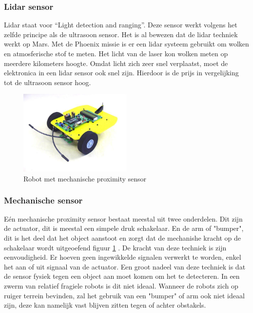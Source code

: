 \documentclass[10pt,a4paper]{article}
\begin{document}
\subsubsection{Lidar sensor}
Lidar staat voor “Light detection and ranging”. Deze sensor werkt volgens het zelfde principe als de ultrasoon sensor. Het is al bewezen dat de lidar techniek werkt op Mars. Met de Phoenix missie is er een lidar systeem gebruikt om wolken en atmosferische stof te meten\cite{lidarmars}. Het licht van de laser kon wolken meten op meerdere kilometers hoogte. Omdat licht zich zeer snel verplaatst, moet de elektronica in een lidar sensor ook snel zijn. Hierdoor is de prijs in vergelijking tot de ultrasoon sensor hoog.

\begin{figure}[!ht]

  \centering
      \includegraphics[width=0.5\textwidth]{voelsprieten.jpg}
  \caption{Robot met mechanische proximity sensor}  \label{voelspriet}
 
\end{figure}

\subsubsection{Mechanische sensor}
Eén mechanische proximity sensor bestaat meestal uit twee onderdelen. Dit zijn de actuator, dit is meestal een simpele druk schakelaar. En de arm of "bumper", dit is het deel dat het object aanstoot en zorgt dat de mechanishe kracht op de schakelaar wordt uitgeoefend figuur \ref{voelspriet} . De kracht van deze techniek is zijn eenvoudigheid. Er hoeven geen ingewikkelde signalen verwerkt te worden, enkel het aan of uit signaal van de actuator. Een groot nadeel van deze techniek is dat de sensor fysiek tegen een object aan moet komen om het te detecteren. In een zwerm van relatief fragiele robots is dit niet ideaal. Wanneer de robots zich op ruiger terrein bevinden, zal het gebruik van een "bumper" of arm ook niet ideaal zijn, deze kan namelijk vast blijven zitten tegen of achter obstakels.
\end{document}
